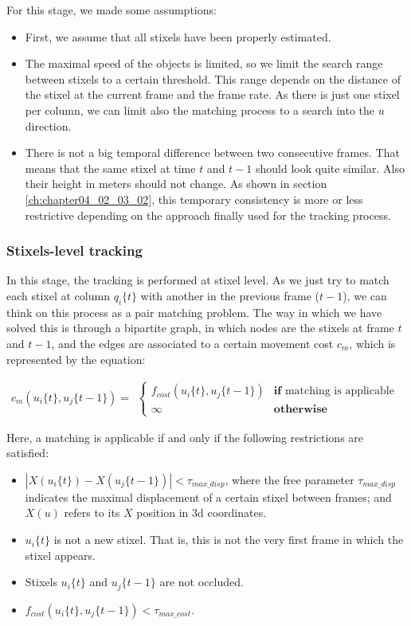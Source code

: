 For this stage, we made some assumptions:
\begin{itemize}
 \item First, we assume that all stixels have been properly estimated.
 \item The maximal speed of the objects is limited, so we limit the search range between stixels to a certain threshold. This range depends on the distance of the stixel at the current frame and the frame rate. As there is just one stixel per column, we can limit also the matching process to a search into the $u$ direction.
 \item There is not a big temporal difference between two consecutive frames. That means that the same stixel at time $t$ and $t - 1$ should look quite similar. Also their height in meters should not change. As shown in section \ref{ch:chapter04_02_03_02}, this temporary consistency is more or less restrictive depending on the approach finally used for the tracking process.
\end{itemize}

\subsubsection{Stixels-level tracking}\label{ch:chapter04_01_03_01}

In this stage, the tracking is performed at stixel level. As we just try to match each stixel at column $q_i\{t\}$ with another in the previous frame ($t - 1$), we can think on this process as a pair matching problem. The way in which we have solved this is through a bipartite graph, in which nodes are the stixels at frame $t$ and $t - 1$, and the edges are associated to a certain movement cost $c_m$, which is represented by the equation:

\begin{equation}\label{eq:cp04_stixel_movement_cost}
  c_m(u_i\{t\}, u_j\{t - 1\}) = 
  \begin{align*}
    \begin{cases}
    f_{cost}(u_i\{t\}, u_j\{t - 1\}) & \textbf{if} \text{ matching is applicable} \\
    \infty & \textbf{otherwise}
    \end{cases}
  \end{align*}
\end{equation}

Here, a matching is applicable if and only if the following restrictions are satisfied:
\begin{itemize}
 \item $|X(u_i\{t\}) - X(u_j\{t - 1\})| < \tau_{max\_disp}$, where the free parameter $\tau_{max\_disp}$ indicates the maximal displacement of a certain stixel between frames; and $X(u)$ refers to its $X$ position in 3d coordinates.
 \item $u_i\{t\}$ is not a new stixel. That is, this is not the very first frame in which the stixel appears.
 \item Stixels $u_i\{t\}$ and $u_j\{t - 1\}$ are not occluded.
 \item $f_{cost}(u_i\{t\}, u_j\{t - 1\}) < \tau_{max\_cost}$.
\end{itemize}

